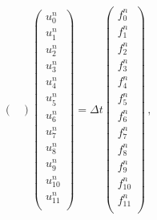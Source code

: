 \documentclass[11pt]{article}
\begin{document}
\begin{equation}
\begin{pmatrix}
\end{pmatrix}
\left(
\begin{array}{c}
u^{n}_{0}\\
u^{n}_{1}\\
u^{n}_{2}\\
u^{n}_{3}\\
u^{n}_{4}\\
u^{n}_{5}\\
u^{n}_{6}\\
u^{n}_{7}\\
u^{n}_{8}\\
u^{n}_{9}\\
u^{n}_{10}\\
u^{n}_{11}\\
\end{array}
\right)
=
\Delta t 
\left(
\begin{array}{c}
f^{n}_{0}\\
f^{n}_{1}\\
f^{n}_{2}\\
f^{n}_{3}\\
f^{n}_{4}\\
f^{n}_{5}\\
f^{n}_{6}\\
f^{n}_{7}\\
f^{n}_{8}\\
f^{n}_{9}\\
f^{n}_{10}\\
f^{n}_{11}\\
\end{array}
\right) \,,
\label{eq:sysMat2}
\end{equation}
\end{document}

